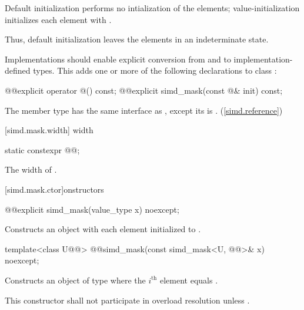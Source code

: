 \pnum
Default initialization performs no intialization of the elements; value-initialization initializes each element with . \begin{note}Thus, default initialization leaves the elements in an indeterminate state.\end{note}

\pnum
Implementations should enable explicit conversion from and to implementation-defined types. This adds one or more of the following declarations to class :

\begin{codeblock}
@@explicit operator @\impdef@() const;
@@explicit simd_mask(const @\impdef@& init) const;
\end{codeblock}

\pnum
The member type  has the same interface as , except its  is . (\ref{simd.reference})

[simd.mask.width]{ width}

\begin{itemdecl}
static constexpr @@;
\end{itemdecl}

\begin{itemdescr}
  \pnum\returns
  The width of .
\end{itemdescr}

[simd.mask.ctor]{\texorpdfstring{onstructors}{simd_mask constructors}}

\begin{itemdecl}
@@explicit simd_mask(value_type x) noexcept;
\end{itemdecl}

\begin{itemdescr}
  \pnum\effects
  Constructs an object with each element initialized to .
\end{itemdescr}

\begin{itemdecl}
template<class U@@>
  @@simd_mask(const simd_mask<U, @@>& x) noexcept;
\end{itemdecl}

\begin{itemdescr}
  \pnum\effects
  Constructs an object of type  where the $i^\text{th}$ element equals  \foralli.

  \pnum\remarks
  This constructor shall not participate in overload resolution unless .
\end{itemdescr}

